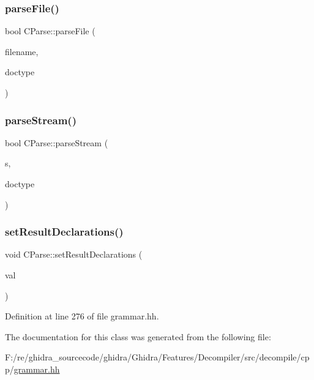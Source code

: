 \mbox{\label{class_c_parse_ae38f99d869ad987da0d5bbf2725f8ad9}} 
\subsubsection{\texorpdfstring{parseFile()}{parseFile()}}
{\footnotesize\ttfamily bool C\+Parse\+::parse\+File (\begin{DoxyParamCaption}\item[{const string \&}]{filename,  }\item[{uint4}]{doctype }\end{DoxyParamCaption})}

\mbox{\label{class_c_parse_a98fdd0bf6732406e9ba9b7b52ff1315f}} 
\subsubsection{\texorpdfstring{parseStream()}{parseStream()}}
{\footnotesize\ttfamily bool C\+Parse\+::parse\+Stream (\begin{DoxyParamCaption}\item[{istream \&}]{s,  }\item[{uint4}]{doctype }\end{DoxyParamCaption})}

\mbox{\label{class_c_parse_a0174a660f08394d7735f5699ce969cd5}} 
\subsubsection{\texorpdfstring{setResultDeclarations()}{setResultDeclarations()}}
{\footnotesize\ttfamily void C\+Parse\+::set\+Result\+Declarations (\begin{DoxyParamCaption}\item[{vector$<$ \mbox{\hyperlink{class_type_declarator}{Type\+Declarator}} $\ast$ $>$ $\ast$}]{val }\end{DoxyParamCaption})\hspace{0.3cm}{\ttfamily [inline]}}



Definition at line 276 of file grammar.\+hh.



The documentation for this class was generated from the following file\+:\begin{DoxyCompactItemize}
\item 
F\+:/re/ghidra\+\_\+sourcecode/ghidra/\+Ghidra/\+Features/\+Decompiler/src/decompile/cpp/\mbox{\hyperlink{grammar_8hh}{grammar.\+hh}}\end{DoxyCompactItemize}
